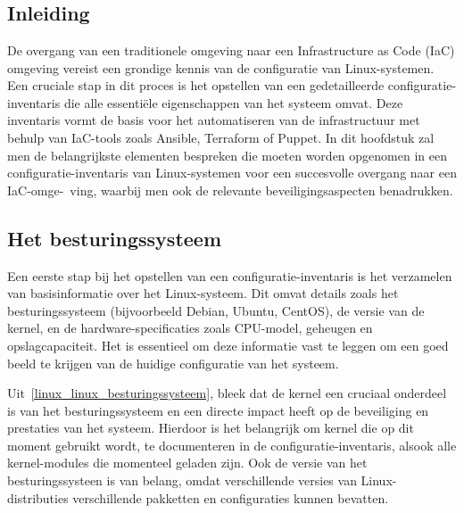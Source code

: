 
\chapter{}
\label{ch:risicoanalyse}

\section{Inleiding}
\label{risico_inleiding}

De overgang van een traditionele omgeving naar een Infrastructure as Code (IaC) omgeving vereist een grondige kennis van de configuratie van Linux-systemen.
Een cruciale stap in dit proces is het opstellen van een gedetailleerde configuratie-inventaris die alle essenti\"ele eigenschappen van het systeem omvat.
Deze inventaris vormt de basis voor het automatiseren van de infrastructuur met behulp van IaC-tools zoals Ansible, Terraform of Puppet.
In dit hoofdstuk zal men de belangrijkste elementen bespreken die moeten worden opgenomen in een configuratie-inventaris van Linux-systemen voor een succesvolle overgang naar een IaC-omge-\ ving, waarbij men ook de relevante beveiligingsaspecten benadrukken.

\section{Het besturingssysteem}
\label{risico_besturingssysteem}

Een eerste stap bij het opstellen van een configuratie-inventaris is het verzamelen van basisinformatie over het Linux-systeem.
Dit omvat details zoals het besturingssysteem (bijvoorbeeld Debian, Ubuntu, CentOS), de versie van de kernel, en de hardware-specificaties zoals CPU-model, geheugen en opslagcapaciteit.
Het is essentieel om deze informatie vast te leggen om een goed beeld te krijgen van de huidige configuratie van het systeem.

Uit~\ref{linux_linux_besturingssysteem}, bleek dat de kernel een cruciaal onderdeel is van het besturingssysteem en een directe impact heeft op de beveiliging en prestaties van het systeem.
Hierdoor is het belangrijk om kernel die op dit moment gebruikt wordt, te documenteren in de configuratie-inventaris, alsook alle kernel-modules die momenteel geladen zijn.
Ook de versie van het besturingssysteen is van belang, omdat verschillende versies van Linux-distributies verschillende pakketten en configuraties kunnen bevatten.

